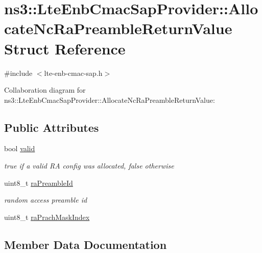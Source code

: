 \hypertarget{structns3_1_1LteEnbCmacSapProvider_1_1AllocateNcRaPreambleReturnValue}{}\section{ns3\+:\+:Lte\+Enb\+Cmac\+Sap\+Provider\+:\+:Allocate\+Nc\+Ra\+Preamble\+Return\+Value Struct Reference}
\label{structns3_1_1LteEnbCmacSapProvider_1_1AllocateNcRaPreambleReturnValue}


{\ttfamily \#include $<$lte-\/enb-\/cmac-\/sap.\+h$>$}



Collaboration diagram for ns3\+:\+:Lte\+Enb\+Cmac\+Sap\+Provider\+:\+:Allocate\+Nc\+Ra\+Preamble\+Return\+Value\+:
\subsection*{Public Attributes}
\begin{DoxyCompactItemize}
\item 
bool \hyperlink{structns3_1_1LteEnbCmacSapProvider_1_1AllocateNcRaPreambleReturnValue_a9b118a8ef02ad3634f82fe9da62c0914}{valid}
\begin{DoxyCompactList}\small\item\em true if a valid RA config was allocated, false otherwise \end{DoxyCompactList}\item 
uint8\+\_\+t \hyperlink{structns3_1_1LteEnbCmacSapProvider_1_1AllocateNcRaPreambleReturnValue_a1a92ec4cf83011b7945942f64d274dd1}{ra\+Preamble\+Id}
\begin{DoxyCompactList}\small\item\em random access preamble id \end{DoxyCompactList}\item 
uint8\+\_\+t \hyperlink{structns3_1_1LteEnbCmacSapProvider_1_1AllocateNcRaPreambleReturnValue_ad9a4a01c74376c8eea53c44571d009ba}{ra\+Prach\+Mask\+Index}
\end{DoxyCompactItemize}


\subsection{Member Data Documentation}
